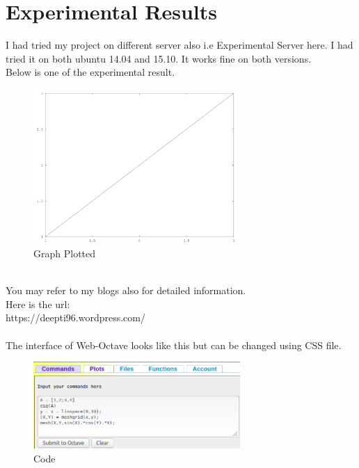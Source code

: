 
\section{Experimental Results}
I had tried my project on different server also i.e Experimental Server here. I had tried it on both ubuntu 14.04 and 15.10. It works fine on both versions.\\
Below is one of the experimental result.\\
\begin{figure}[!ht]
	\centering
	\includegraphics[width=0.7\textwidth]{input/images/plot1.png}                
	\caption{Graph Plotted}
	\hspace{-1.5em}
\end{figure}\\
You may refer to my blogs also for detailed information.\\
Here is the url: \\
https://deepti96.wordpress.com/ \\\\
The interface of Web-Octave looks like this but can be changed using CSS file.
\begin{figure}[!ht]
	\centering
	\includegraphics[width=0.7\textwidth]{input/images/p.png}                
	\caption{Code}
	\hspace{-1.5em}
\end{figure}\\\\
